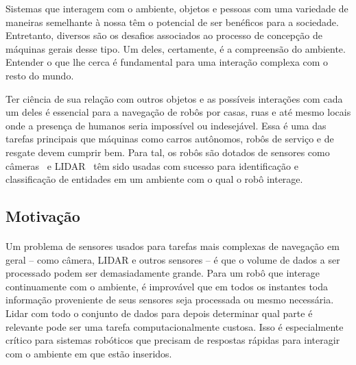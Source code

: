 \documentclass[11pt]{article}
\begin{document}
Sistemas que interagem com o ambiente, objetos e pessoas 
com uma variedade de maneiras semelhante à nossa têm o potencial de ser 
benéficos para a sociedade. 
Entretanto, diversos são os desafios associados ao processo de concepção de 
máquinas gerais desse tipo. 
Um deles, certamente, é a compreensão do ambiente. 
Entender o que lhe cerca é fundamental para uma interação complexa com o resto
do mundo. 

Ter ciência de sua relação com outros objetos e 
as possíveis interações com cada um deles é essencial para a navegação 
de robôs por casas, ruas e até mesmo locais onde a presença de humanos seria 
impossível ou indesejável.
Essa é uma das tarefas principais que máquinas como carros autônomos, 
robôs de serviço \cite{ifr} e de resgate devem cumprir bem. 
Para tal, os robôs são dotados de sensores como câmeras~\cite{vision} e 
LIDAR~\cite{car} têm sido usadas com sucesso para identificação e 
classificação de entidades em um ambiente com o qual o robô interage. 

\subsection{Motivação}
\paragraph{}
Um problema de sensores usados para tarefas mais complexas de navegação
em geral -- como câmera, LIDAR e outros sensores --
é que o volume de dados a ser processado podem ser demasiadamente grande. 
Para um robô que interage continuamente com o ambiente, é improvável que em 
todos os instantes  toda informação proveniente de seus sensores seja 
processada ou mesmo necessária. 
Lidar com todo o conjunto de dados para depois determinar qual parte é 
relevante pode ser uma tarefa  computacionalmente custosa. 
Isso é especialmente crítico para sistemas robóticos que precisam de respostas
rápidas para interagir com o ambiente em que estão inseridos. 
\end{document}
